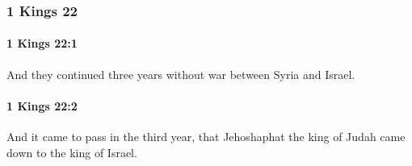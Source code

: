 	\subsubsection{1 Kings 22} %
		\label{1KINGS-22}

		\paragraph{1 Kings 22:1} %
			\label{1KINGS-22-1}

			And they continued three years without war between Syria and Israel.


		\paragraph{1 Kings 22:2} %
			\label{1KINGS-22-2}

			And it came to pass in the third year, that Jehoshaphat the king of Judah came down to the king of Israel.


